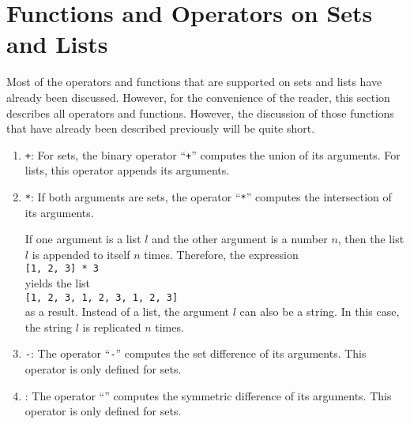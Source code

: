 \section{Functions and Operators on Sets and Lists}
Most of the operators and functions that are supported on sets and lists have already been
discussed.  However, for the convenience of the reader, this section describes all
operators and functions.  However, the discussion of those functions that have already
been described previously will be quite short.
\begin{enumerate}
\item \texttt{+}:  For sets, the binary operator ``\texttt{+}'' computes the union
      of its arguments.  For lists, this operator appends its arguments.
\item \texttt{*}:  If both arguments are sets, the operator ``\texttt{*}'' computes the
      intersection of its arguments. 
      
      If one argument is a list $l$ and the other argument is a number $n$, then the list
      $l$ is appended to itself $n$ times.  Therefore, the expression
      \\[0.2cm]
      \hspace*{1.3cm}
      \texttt{[1, 2, 3] * 3}
      \\[0.2cm]
      yields the list
      \\[0.2cm]
      \hspace*{1.3cm}
      \texttt{[1, 2, 3, 1, 2, 3, 1, 2, 3]}
      \\[0.2cm]
      as a result.  Instead of a list, the argument $l$ can also be a string.
      In this case, the string $l$ is replicated $n$ times.
\item \texttt{-}:  The operator ``\texttt{-}'' computes the set difference of its arguments.
      This operator is only defined for sets.
\item \texttt{}:  The operator ``\texttt{}'' computes the symmetric 
      difference of its arguments.
      This operator is only defined for sets.


\end{enumerate}
